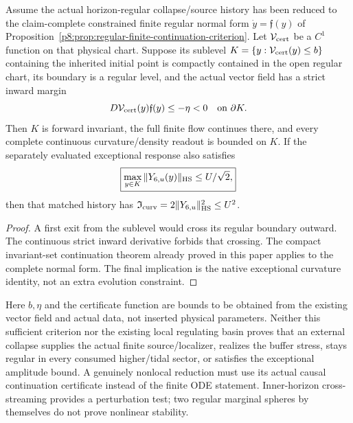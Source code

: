 \documentclass[12pt,a4paper]{article}
\begin{document}
\begin{corollary}
\label{p8:cor:v2210-lit-bh-invariant-certificate}
Assume the actual horizon-regular collapse/source history has been reduced
to the claim-complete constrained finite regular normal form
$\dot y=\mathfrak f(y)$ of
Proposition~\ref{p8:prop:regular-finite-continuation-criterion}.
Let $\mathcal V_{\rm cert}$ be a $C^1$ function on that physical chart.
Suppose its sublevel
$K=\{y:\mathcal V_{\rm cert}(y)\le b\}$ containing the inherited initial
point is compactly contained in the open regular chart, its boundary is a
regular level, and the actual vector field has a strict inward margin
\[
 D\mathcal V_{\rm cert}(y)\mathfrak f(y)\le-\eta<0
       \quad\hbox{on }\partial K.
\]
Then $K$ is forward invariant, the full finite flow continues there, and
every complete continuous curvature/density readout is bounded on $K$.
If the separately evaluated exceptional response also satisfies
\begin{equation}
\label{p8:eq:v2210-lit-bh-range-certificate}
 \boxed{\max_{y\in K}\|Y_{6,u}(y)\|_{\rm HS}\le U/\sqrt2,}
\end{equation}
then that matched history has
$\mathfrak I_{\rm curv}=2\|Y_{6,u}\|_{\rm HS}^2\le U^2$.
\end{corollary}
\begin{proof}
A first exit from the sublevel would cross its regular boundary outward.
The continuous strict inward derivative forbids that crossing.
The compact invariant-set continuation theorem already proved in this
paper applies to the complete normal form. The final implication is the
native exceptional curvature identity, not an extra evolution constraint.
\end{proof}
Here $b,\eta$ and the certificate function are bounds to be obtained from
the existing vector field and actual data, not inserted physical
parameters. Neither this sufficient criterion nor the existing local
regulating basin proves that an external collapse supplies the actual
finite source/localizer, realizes the buffer stress, stays regular in every
consumed higher/tidal sector, or satisfies the exceptional amplitude bound.
A genuinely nonlocal reduction must use its actual causal continuation
certificate instead of the finite ODE statement. Inner-horizon
cross-streaming \cite{LitBHPoissonIsrael1990} provides a perturbation test;
two regular marginal spheres by themselves do not prove nonlinear stability.

\end{document}
